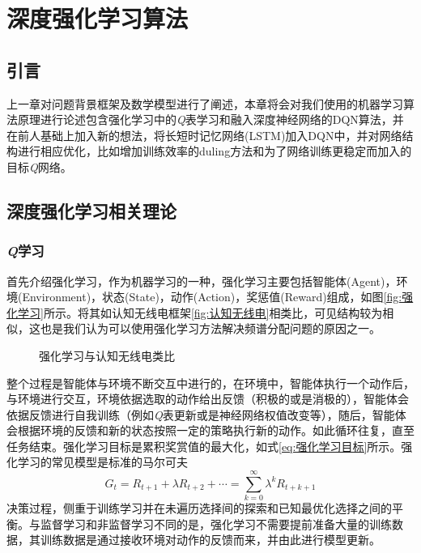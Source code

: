 \chapter{深度强化学习算法}
\section{引言}
上一章对问题背景框架及数学模型进行了阐述，本章将会对我们使用的机器学习算法原理进行论述包含强化学习中的\textit{Q}表学习和融入深度神经网络的DQN算法，并在前人基础上加入新的想法，将长短时记忆网络(LSTM)加入DQN中，并对网络结构进行相应优化，比如增加训练效率的duling方法和为了网络训练更稳定而加入的目标\textit{Q}网络。
\section{深度强化学习相关理论}
\subsection{\textit{Q}学习}
首先介绍强化学习，作为机器学习的一种，强化学习主要包括智能体(Agent)，环境(Environment)，状态(State)，动作(Action)，奖惩值(Reward)组成，如图\ref{fig:强化学习}所示。将其如认知无线电框架\ref{fig:认知无线电}相类比，可见结构较为相似，这也是我们认为可以使用强化学习方法解决频谱分配问题的原因之一。
\begin{figure}[htbp]
	\begin{minipage}{\textwidth}
		\centering
		\subfigure{\label{fig:强化学习}}\addtocounter{subfigure}{-2}
		\hspace{1em}
		\subfigure{\label{fig:认知无线电}}\addtocounter{subfigure}{-2}
		\hspace{1em}	
	\end{minipage}
	\vspace{0.2em}
	\caption{强化学习与认知无线电类比}\label{fig:强化学习类比认知无线电}
\end{figure}
整个过程是智能体与环境不断交互中进行的，在环境中，智能体执行一个动作后，与环境进行交互，环境依据选取的动作给出反馈（积极的或是消极的），智能体会依据反馈进行自我训练（例如\textit{Q}表更新或是神经网络权值改变等），随后，智能体会根据环境的反馈和新的状态按照一定的策略执行新的动作。如此循环往复，直至任务结束。强化学习目标是累积奖赏值的最大化，如式\ref{eq:强化学习目标}所示。强化学习的常见模型是标准的马尔可夫
\begin{equation}\label{eq:强化学习目标}
G_{t}=R_{t+1}+\lambda R_{t+2}+\cdots=\sum_{k=0}^{\infty}\lambda^{k}R_{t+k+1}
\end{equation}
决策过程，侧重于训练学习并在未遍历选择间的探索和已知最优化选择之间的平衡。与监督学习和非监督学习不同的是，强化学习不需要提前准备大量的训练数据，其训练数据是通过接收环境对动作的反馈而来，并由此进行模型更新。

